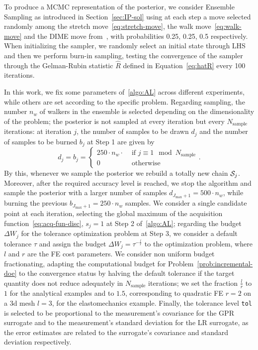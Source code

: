 To produce a MCMC representation of the posterior, we consider Ensemble Sampling as introduced in Section~\ref{sec:IP-sol} using at each step a move selected randomly among the stretch move~\eqref{eq:stretch-move}, the walk move~\eqref{eq:walk-move} and the DIME move from~\cite{Boehl}, with probabilities 0.25, 0.25, 0.5 respectively. 
When initializing the sampler, we randomly select an initial state through LHS and then we perform burn-in sampling, testing the convergence of the sampler through the Gelman-Rubin statistic $\hat R$ defined in Equation~\eqref{eq:hatR} every 100 iterations.
\medskip

In this work, we fix some parameters of~\ref{algo:AL} across different experiments, while others are set according to the specific problem.
Regarding sampling, the number $n_w$ of walkers in the ensemble is selected depending on the dimensionality of the problem; the posterior is not sampled at every iteration but every $N_{\text{sample}}$ iterations: at iteration $j$, the number of samples to be drawn $d_j$ and the number of samples to be burned $b_j$ at Step 1 are given by
\[
d_j = b_j = \begin{cases}
    250 \cdot n_w \cdot  & \text{ if } j \equiv 1 \mod N_{\text{sample}} \\
    0 & \text{ otherwise}
\end{cases}.
\]
By this, whenever we sample the posterior we rebuild a totally new chain $\mathcal S_j$. 
Moreover, after the required accuracy level is reached, we stop the algorithm and sample the posterior with a larger number of samples $d_{J_{\max} +1} = 500 \cdot n_w$, while burning the previous $b_{J_{\max} +1} = 250 \cdot n_w$ samples.\newline
We consider a single candidate point at each iteration, selecting the global maximum of the acquisition function~\eqref{eq:acq-fun-disc}, $s_j = 1$ at Step 2 of~\ref{algo:AL}; regarding the budget $\Delta W_j$ for the tolerance optimization problem at Step 3, we consider a default tolerance $\tau$ and assign the budget $\Delta W_j = \tau^{-\frac{l}{r}}$ to the optimization problem, where $l$ and $r$ are the FE cost parameters.
We consider non uniform budget fractionating, adapting the computational budget for Problem~\eqref{prob:incremental-doe} to the convergence status by halving the default tolerance if the target quantity does not reduce adequately in $N_\text{sample}$ iterations; we set the fraction $\frac{l}{r}$ to $1$ for the analytical examples and to $1.5$, corresponding to quadratic FE $r=2$ on a 3d mesh $l=3$, for the elastomechanics example.  \newline
Finally, the tolerance level \texttt{tol} is selected to be proportional to the measurement's covariance for the GPR surrogate and to the measurement's standard deviation for the LR surrogate, as the error estimates are related to the surrogate's covariance and standard deviation respectively.\medskip

